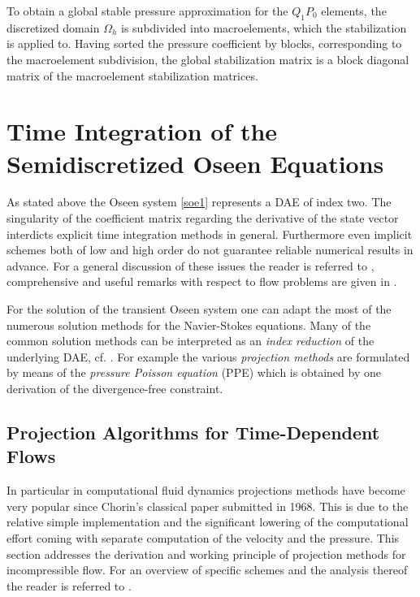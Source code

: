 \documentclass[a4paper,10pt,BCOR=15mm]{scrbook}
\begin{document}
To obtain a global stable pressure approximation for the $Q_1P_0$ elements, the discretized domain $\Omega_h$ is subdivided into macroelements, which the stabilization is applied to. Having sorted the pressure coefficient by blocks, corresponding to the macroelement subdivision, the global stabilization matrix is a block diagonal matrix of the macroelement stabilization matrices.



\section[Time Integration of the Semidiscretized Equations]{Time Integration of the Semidiscretized Oseen Equations}\label{titso}
As stated above the Oseen system \eqref{soe1} represents a DAE of index two. The singularity of the coefficient matrix regarding the derivative of the state vector interdicts explicit time integration methods in general. Furthermore even implicit schemes both of low and high order do not guarantee reliable numerical results in advance. For a general discussion of these issues the reader is referred to \cite{mehr}, comprehensive and useful remarks with respect to flow problems are given in \cite[Ch. 3.16.1]{gre2}.

For the solution of the transient Oseen system one can adapt the most of the numerous solution methods for the Navier-Stokes equations. Many of the common solution methods can be interpreted as an \textit{index reduction} of the underlying DAE, cf. \cite{weic}. For example the various \textit{projection methods} are formulated by means of the \textit{pressure Poisson equation} (PPE) which is obtained by one derivation of the divergence-free constraint.


\subsection[Projection Algrorithms]{Projection Algorithms for Time-Dependent Flows}\label{paftn}

In particular in computational fluid dynamics projections methods have become very popular since Chorin's classical paper \cite{chorin} submitted in 1968. This is due to the relative simple implementation and the significant lowering of the computational effort coming with separate computation of the velocity and the pressure. This section addresses the derivation and working principle of projection methods for incompressible flow. For an overview of specific schemes and the analysis thereof the reader is referred to \cite{prohl}.
\end{document}
